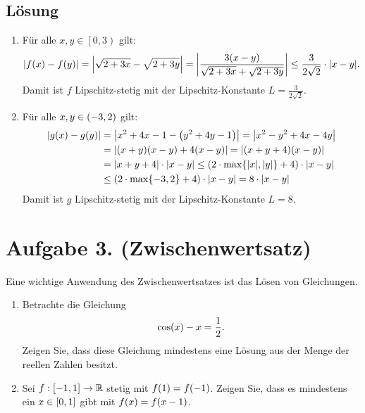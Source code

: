 \documentclass[german,12pt]{homework}
\newcommand{\RR}{\mathbb{R}}
\DeclarePairedDelimiter{\absolute}{\lvert}{\rvert}
\DeclarePairedDelimiter{\enbrace}{(}{)}
\DeclarePairedDelimiter{\benbrace}{[}{]}
\DeclarePairedDelimiter{\penbrace}{\{}{\}}
\begin{document}
    \subsection*{Lösung}
    \begin{enumerate}
        \item Für alle \(x, y \in \left[0, 3\right)\) gilt:
        \[\absolute*{f\enbrace*{x} - f\enbrace*{y}} = \absolute*{\sqrt{2 + 3x} - \sqrt{2 + 3y}} = \absolute*{\frac{3\enbrace*{x - y}}{\sqrt{2 + 3x} + \sqrt{2 + 3y}}} \le \frac{3}{2\sqrt{2}} \cdot \absolute*{x - y}.\]
        Damit ist \(f\) Lipschitz-stetig mit der Lipschitz-Konstante \(L = \frac{3}{2\sqrt{2}}\).
        \item Für alle \(x, y \in \enbrace*{-3, 2}\) gilt:
        \begin{align*}
            \absolute*{g\enbrace*{x} - g\enbrace*{y}} &= \absolute*{x^2 + 4x - 1 - \enbrace*{y^2 + 4y - 1}} = \absolute*{x^2 - y^2 + 4x - 4y}\\
            &= \absolute*{\enbrace*{x + y}\enbrace*{x - y} + 4\enbrace*{x - y}} = \absolute*{\enbrace*{x + y + 4}\enbrace*{x - y}}\\
            &= \absolute*{x + y + 4} \cdot \absolute*{x - y} \le \enbrace*{2 \cdot \max\penbrace*{\absolute*{x}, \absolute*{y}} + 4} \cdot \absolute*{x - y}\\
            &\le \enbrace*{2 \cdot \max\penbrace*{-3, 2} + 4} \cdot \absolute*{x - y} = 8 \cdot \absolute*{x - y}
        \end{align*}
        Damit ist \(g\) Lipschitz-stetig mit der Lipschitz-Konstante \(L = 8\).
    \end{enumerate}

    \section*{Aufgabe 3. (Zwischenwertsatz)}

    \begin{problem}
        Eine wichtige Anwendung des Zwischenwertsatzes ist das Lösen von Gleichungen.
        \begin{enumerate}
            \item Betrachte die Gleichung
            \[\cos\enbrace*{x} - x = \frac{1}{2}.\]
            Zeigen Sie, dass diese Gleichung mindestens eine Lösung aus der Menge der reellen Zahlen besitzt.
            \item Sei \(f: \benbrace*{-1, 1} \to \RR\) stetig mit \(f\enbrace*{1} = f\enbrace*{-1}\). Zeigen Sie, dass es mindestens ein \(x \in \benbrace*{0, 1}\) gibt mit \(f\enbrace*{x} = f\enbrace*{x - 1}\).
        \end{enumerate}
    \end{problem}
\end{document}
